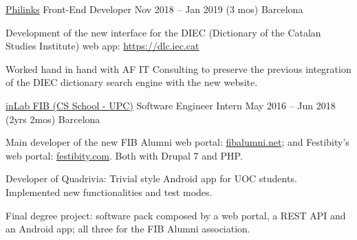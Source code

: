 \begin{cventries}
  \cventry
    {\href{https://philinks.com}{Philinks}} %
    {Front-End Developer} %
    {Nov 2018 – Jan 2019 (3 mos)} %
    {Barcelona} %
    {
      \begin{cvitems} %
        \item {Development of the new interface for the DIEC (Dictionary of the Catalan Studies Institute) web app: \url{https://dlc.iec.cat}}
        \item {Worked hand in hand with AF IT Consulting to preserve the previous integration of the DIEC dictionary search engine with the new website.}
      \end{cvitems}
    }

  \cventry
    {\href{https://inlab.fib.upc.edu/ca}{inLab FIB (CS School - UPC)}} %
    {Software Engineer Intern} %
    {May 2016 – Jun 2018 (2yrs 2mos)} %
    {Barcelona} %
    {
      \begin{cvitems} %
        \item {Main developer of the new FIB Alumni web portal: \url{fibalumni.net}; and Festibity’s web portal: \url{festibity.com}. Both with Drupal 7 and PHP.}
        \item {Developer of Quadrivia: Trivial style Android app for UOC students. Implemented new functionalities and test modes.}
        \item {Final degree project: software pack composed by a web portal, a REST API and an Android app; all three for the FIB Alumni association.}
      \end{cvitems}
    }

\end{cventries}
